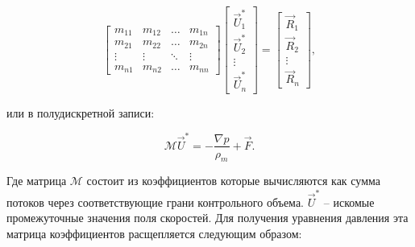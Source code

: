 \begin{equation}
    \left[
        \begin{array}{cccc}
            m_{11} & m_{12} & \ldots & m_{1n}\\[0.055cm]
            m_{21} & m_{22} & \ldots & m_{2n}\\[0.055cm]
            \vdots & \vdots & \ddots & \vdots\\[0.055cm]
            m_{n1} & m_{n2} & \ldots & m_{nn}
        \end{array}
        \right]
        \left[
        \begin{array}{c}
            \vec{U}_{1}^* \\[0.1cm] 
            \vec{U}_{2}^* \\[0.1cm]
            \vdots \\[0.1cm]
            \vec{U}_{n}^*  
        \end{array}
        \right]
        =
        \left[
        \begin{array}{c}
            \vec{R}_{1} \\[0.1cm] 
            \vec{R}_{2} \\[0.1cm]
            \vdots \\[0.1cm]
            \vec{R}_{n}  
        \end{array}
    \right],
\end{equation}

или в полудискретной записи:

\begin{equation}
    \mathcal{M} \vec{U}^* = -\frac{\nabla p}{\rho_m} + \vec{F}.
\end{equation}

Где матрица  $\mathcal{M}$ состоит из коэффициентов   которые вычисляются как сумма потоков через соответствующие грани контрольного объема. $\vec{U}^*$ -- искомые промежуточные значения поля скоростей. Для получения уравнения давления эта матрица коэффициентов расщепляется следующим образом:

